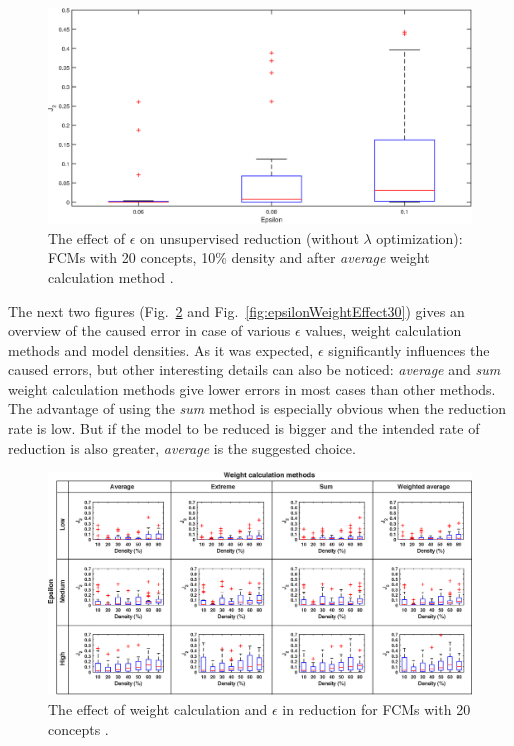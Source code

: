 \documentclass[graybox]{svmult}
\begin{document}
\begin{figure}[hbt]
  \includegraphics[width=\textwidth]{j2_unsup_c20_d10.eps}
  \caption{The effect of $\epsilon$ on unsupervised reduction (without 
  $\lambda$ optimization): FCMs with 20 concepts, 10\% density and after 
\emph{average} weight calculation method \cite{hatwagner2018two}.}
  \label{fig:epsilonEffect}
\end{figure}

The next two figures (Fig.~\ref{fig:epsilonWeightEffect20} and 
Fig.~\ref{fig:epsilonWeightEffect30}) gives an overview of the caused 
error in case of various $\epsilon$ values, weight calculation methods 
and model densities. As it was expected, $\epsilon$ significantly 
influences the caused errors, but other interesting details can also be 
noticed: \emph{average} and \emph{sum} weight calculation methods give 
lower errors in most cases than other methods. The advantage of using 
the \emph{sum} method is especially obvious when the reduction rate is 
low. But if the model to be reduced is bigger and the intended rate of 
reduction is also greater, \emph{average} is the suggested choice. 

\begin{figure}[hbt]
  \includegraphics[width=\textwidth]{j2_unsup_c20.eps}
  \caption{The effect of weight calculation and $\epsilon$ in reduction 
  for FCMs with 20 concepts \cite{hatwagner2018two}.}
  \label{fig:epsilonWeightEffect20}
\end{figure}
\end{document}
